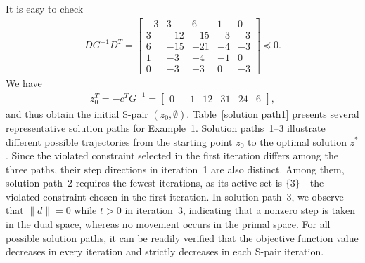 \documentclass{article}
\begin{document}
	It is easy to check
	\begin{align*}
		DG^{-1}D^{T} = \begin{bmatrix}
			-3 & 3 & 6 & 1 & 0\\
			3 & -12 & -15 & -3 & -3\\
			6 & -15 & -21 & -4 & -3\\
			1 & -3 & -4 & -1 & 0\\
			0 & -3 & -3 & 0 & -3
		\end{bmatrix} \preccurlyeq 0.
	\end{align*}
	We have 
	\begin{align*}
	z_{0}^{T} = -c^{T}G^{-1} = 
	\begin{bmatrix}
		0 & -1 & 12 & 31 & 24 & 6
	\end{bmatrix},
	\end{align*}
	and thus obtain the initial S-pair $(z_{0}, \emptyset)$. 
	Table~\ref{solution path1} presents several representative solution paths for Example~1. 
	Solution paths~1–3 illustrate different possible trajectories from the starting point $z_{0}$ to the optimal solution $z^{\ast}$. 
	Since the violated constraint selected in the first iteration differs among the three paths, their step directions in iteration~1 are also distinct. 
	Among them, solution path~2 requires the fewest iterations, as its active set is $\{3\}$—the violated constraint chosen in the first iteration. 
	In solution path~3, we observe that $\|d\| = 0$ while $t > 0$ in iteration~3, indicating that a nonzero step is taken in the dual space, whereas no movement occurs in the primal space. 
	For all possible solution paths, it can be readily verified that the objective function value decreases in every iteration and strictly decreases in each S-pair iteration.
	
\end{document}
